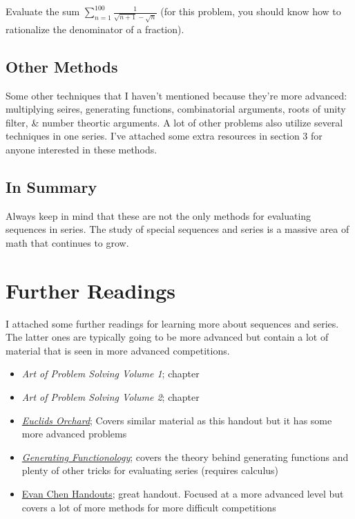 \documentclass[11pt]{article}
\begin{document}
\begin{exercise}
Evaluate the sum $\displaystyle \sum_{n=1} ^ {100} \frac{1}{\sqrt{n+1} - \sqrt{n}}$ (for this problem, you should know how to rationalize the denominator of a fraction).
\end{exercise}
\subsection{Other Methods}
Some other techniques that I haven't mentioned because they're more advanced: multiplying seires, generating functions, combinatorial arguments, roots of unity filter, \& number theortic arguments. A lot of other problems also utilize several techniques in one series. I've attached some extra resources in section 3 for anyone interested in these methods.
\subsection{In Summary}
Always keep in mind that these are not the only methods for evaluating sequences in series. The study of special sequences and series is a massive area of math that continues to grow. 
\section{Further Readings}
I attached some further readings for learning more about sequences and series. The latter ones are typically going to be more advanced but contain a lot of material that is seen in more advanced competitions.
\begin{itemize}
 \item{\textit{Art of Problem Solving Volume 1}; chapter }
 \item {\textit{Art of Problem Solving Volume 2}; chapter }
 \item { \href{http://yu-dylan.github.io/euclid-orchard/Handouts/Sequences_and_Series_in_the_AMC_and_AIME.pdf}{\textit {Euclids Orchard}}; Covers similar material as this handout but it has some more advanced problems }
 \item {\href{https://www2.math.upenn.edu/~wilf/gfology2.pdf}{\textit{Generating Functionology}}; covers the theory behind generating functions and plenty of other tricks for evaluating series (requires calculus)}
 \item {\href{https://web.evanchen.cc/handouts/Summation/Summation.pdf}{Evan Chen Handouts}; great handout. Focused at a more advanced level but covers a lot of more methods for more difficult competitions}
\end{itemize}
\end{document}
